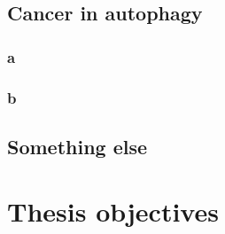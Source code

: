     \subsection{Cancer in autophagy}
        \subsubsection{a}
        \subsubsection{b}
        
        
        
    \subsection{Something else}

\section{Thesis objectives}

